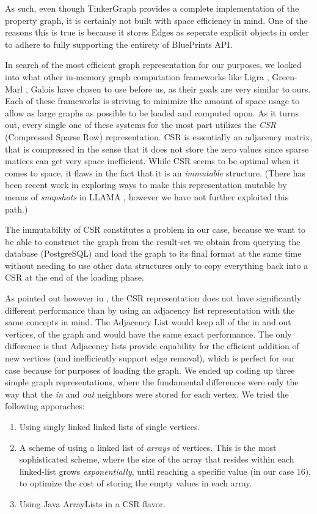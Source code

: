 \documentclass[11pt,letterpaper]{article}
\begin{document}
As such, even though TinkerGraph provides a complete implementation of the property graph, it is certainly not built with space efficiency in mind. One of the reasons this is true is because it stores Edges as seperate explicit objects in order to adhere to fully supporting the entirety of BluePrints API.

In search of the most efficient graph representation for our purposes, we looked into what other in-memory graph computation frameworks like Ligra \cite{ligra}, Green-Marl \cite{greenmarl}, Galois \cite{galois} have chosen to use before us, as their goals are very similar to ours.  Each of these frameworks is striving to minimize the amount of space usage to allow as large graphs as possible to be loaded and computed upon. As it turns out, every single one of these systems for the most part utilizes the \textit{CSR} (Compressed Sparse Row) representation. CSR is essentially an adjacency matrix, that is compressed in the sense that it does not store the zero values since sparse matices can get very space inefficient. While CSR seems to be optimal when it comes to space, it flaws in the fact that it is an \textit{immutable} structure. (There has been recent work in exploring ways to make this representation mutable by means of \textit{snapshots} in LLAMA \cite{llama}, however we have not further exploited this path.)

The immutability of CSR constitutes a problem in our case, because we want to be able to construct the graph from the result-set we obtain from querying the database (PostgreSQL) and load the graph to its final format at the same time without needing to use other data structures only to copy everything back into a CSR at the end of the loading phase.

As pointed out however in \cite{usman2006performance}, the CSR representation does not have significantly different performance than by using an adjacency list representation with the same concepts in mind. The Adjacency List would keep all of the in and out vertices, of the graph and would have the same exact performance. The only difference is that Adjacency lists provide capability for the efficient addition of new vertices (and inefficiently support edge removal), which is perfect for our case because for purposes of loading the graph. We ended up coding up three simple graph representations, where the fundamental differences were only the way that the \textit{in} and \textit{out} neighbors were stored for each vertex. We tried the following apporaches:
\begin{enumerate}
	\item Using singly linked linked lists of single vertices.
	\item A scheme of using a linked list of \textit{arrays} of vertices. This is the most sophisticated scheme, where the size of the array that resides within each linked-list grows \textit{exponentially}, until reaching a specific value (in our case 16), to optimize the cost of storing the empty values in each array.
	\item Using Java ArrayLists in a CSR flavor.
\end{enumerate}
\end{document}
